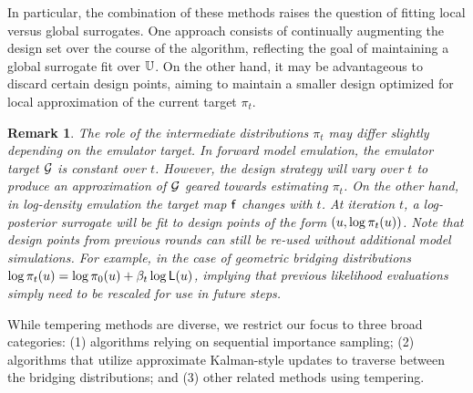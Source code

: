 \documentclass[12pt]{article}
\newtheorem{remark}{Remark}
\begin{document}
In particular, the combination of these methods raises the question of fitting local versus 
global surrogates. One approach consists of continually augmenting the design set over
the course of the algorithm, reflecting the goal of maintaining a global surrogate fit 
over $\mathbb{U}$. On the other hand, 
it may be advantageous to discard certain design points, aiming to maintain a smaller design
optimized for local approximation of the current target $\pi_t$.

\begin{remark}
The role of the intermediate distributions $\pi_t$ may differ slightly depending on the emulator target.
In forward model emulation, the emulator target $\mathcal{G}$ is constant over $t$. However, the design
strategy will vary over $t$ to produce an approximation of $\mathcal{G}$ geared towards estimating 
$\pi_t$. On the other hand, in log-density emulation the target map $\mathsf{f}$ changes with $t$. 
At iteration $t$, a log-posterior surrogate will be fit to design points of the form $(u, \log \pi_t(u))$.
Note that design points from previous rounds can still be re-used without additional model simulations.
For example, in the case of geometric bridging distributions 
$\log \pi_t(u) = \log \pi_0(u) + \beta_t \log \mathsf{L}(u)$,
implying that previous likelihood evaluations simply need to be rescaled for use in future steps.
\end{remark}

While tempering methods are diverse, we restrict our focus to three broad categories:
(1) algorithms relying on sequential importance sampling; (2) algorithms that 
utilize approximate Kalman-style updates to traverse between the bridging distributions;
and (3) other related methods using tempering.
\end{document}
